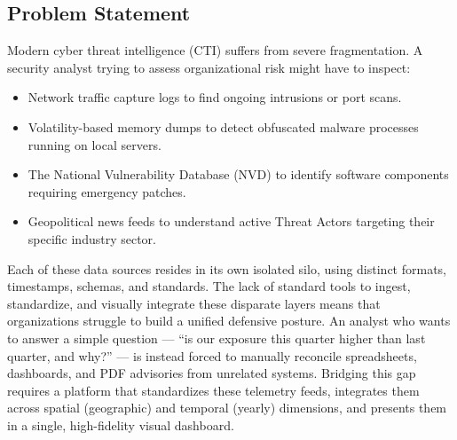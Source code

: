 \documentclass[a4paper, 12pt]{report}
\begin{document}
\subsection{Problem Statement}
Modern cyber threat intelligence (CTI) suffers from severe fragmentation. A security analyst trying to assess organizational risk might have to inspect:
\begin{itemize}
    \item Network traffic capture logs to find ongoing intrusions or port scans.
    \item Volatility-based memory dumps to detect obfuscated malware processes running on local servers.
    \item The National Vulnerability Database (NVD) to identify software components requiring emergency patches.
    \item Geopolitical news feeds to understand active Threat Actors targeting their specific industry sector.
\end{itemize}
Each of these data sources resides in its own isolated silo, using distinct formats, timestamps, schemas, and standards. The lack of standard tools to ingest, standardize, and visually integrate these disparate layers means that organizations struggle to build a unified defensive posture. An analyst who wants to answer a simple question --- ``is our exposure this quarter higher than last quarter, and why?'' --- is instead forced to manually reconcile spreadsheets, dashboards, and PDF advisories from unrelated systems. Bridging this gap requires a platform that standardizes these telemetry feeds, integrates them across spatial (geographic) and temporal (yearly) dimensions, and presents them in a single, high-fidelity visual dashboard.
\end{document}
